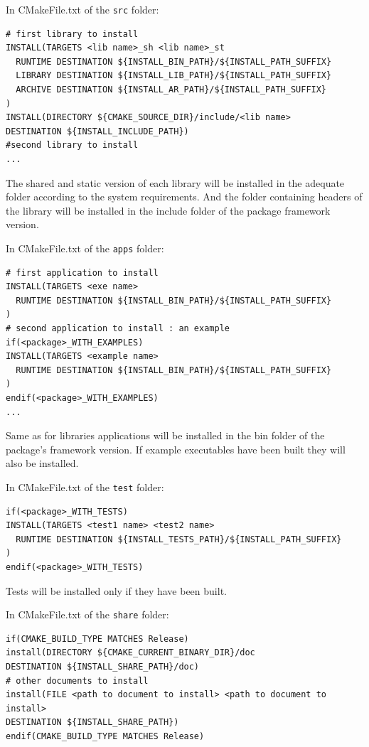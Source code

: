 \documentclass[12pt,a4paper]{article}
\begin{document}
In CMakeFile.txt of the \texttt{src} folder:
\begin{verbatim}
# first library to install
INSTALL(TARGETS <lib name>_sh <lib name>_st 
  RUNTIME DESTINATION ${INSTALL_BIN_PATH}/${INSTALL_PATH_SUFFIX}
  LIBRARY DESTINATION ${INSTALL_LIB_PATH}/${INSTALL_PATH_SUFFIX}
  ARCHIVE DESTINATION ${INSTALL_AR_PATH}/${INSTALL_PATH_SUFFIX}
)
INSTALL(DIRECTORY ${CMAKE_SOURCE_DIR}/include/<lib name>
DESTINATION ${INSTALL_INCLUDE_PATH})
#second library to install
...
\end{verbatim}

The shared and static version of each library will be installed in the adequate folder according to the system requirements. And the folder containing headers of the library will be installed in the include folder of the package framework version.

In CMakeFile.txt of the \texttt{apps} folder:
\begin{verbatim}
# first application to install
INSTALL(TARGETS <exe name>
  RUNTIME DESTINATION ${INSTALL_BIN_PATH}/${INSTALL_PATH_SUFFIX}
)
# second application to install : an example
if(<package>_WITH_EXAMPLES)
INSTALL(TARGETS <example name>
  RUNTIME DESTINATION ${INSTALL_BIN_PATH}/${INSTALL_PATH_SUFFIX}
)
endif(<package>_WITH_EXAMPLES)
...
\end{verbatim}
Same as for libraries applications will be installed in the bin folder of the package's framework version. If example executables have been built they will also be installed.


In CMakeFile.txt of the \texttt{test} folder:
\begin{verbatim}
if(<package>_WITH_TESTS)
INSTALL(TARGETS <test1 name> <test2 name>
  RUNTIME DESTINATION ${INSTALL_TESTS_PATH}/${INSTALL_PATH_SUFFIX}
)
endif(<package>_WITH_TESTS)
\end{verbatim}
Tests will be installed only if they have been built.

In CMakeFile.txt of the \texttt{share} folder:
\begin{verbatim}
if(CMAKE_BUILD_TYPE MATCHES Release)
install(DIRECTORY ${CMAKE_CURRENT_BINARY_DIR}/doc 
DESTINATION ${INSTALL_SHARE_PATH}/doc)
# other documents to install
install(FILE <path to document to install> <path to document to install>
DESTINATION ${INSTALL_SHARE_PATH})
endif(CMAKE_BUILD_TYPE MATCHES Release)
\end{verbatim}
\end{document}
